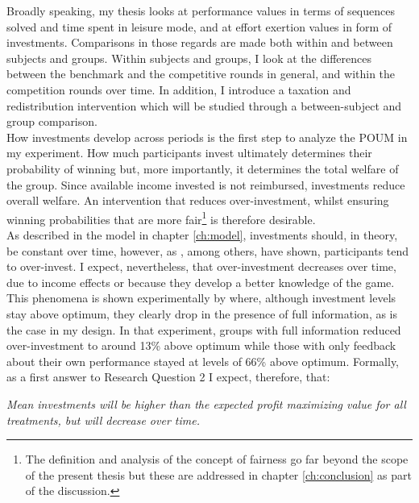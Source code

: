     Broadly speaking, my thesis looks at performance values in terms of sequences solved and time spent in leisure mode, and at effort exertion values in form of investments. Comparisons in those regards are made both within and between subjects and groups. Within subjects and groups, I look at the differences between the benchmark and the competitive rounds in general, and within the competition rounds over time. In addition, I introduce a taxation and redistribution intervention which will be studied through a between-subject and group comparison.\\
    
    How investments develop across periods is the first step to analyze the POUM in my experiment. How much participants invest ultimately determines their probability of winning but, more importantly, it determines the total welfare of the group. Since available income invested is not reimbursed, investments reduce overall welfare. An intervention that reduces over-investment, whilst ensuring winning probabilities that are more fair\footnote{The definition and analysis of the concept of fairness go far beyond the scope of the present thesis but these are addressed in chapter \ref{ch:conclusion} as part of the discussion.} is therefore desirable.\\
    
    As described in the model in chapter \ref{ch:model}, investments should, in theory, be constant over time, however, as \cite{sheremeta2016}, among others, have shown, participants tend to over-invest. I expect, nevertheless, that over-investment decreases over time, due to income effects or because they develop a better knowledge of the game. This phenomena is shown experimentally by \cite{fallucchi2013} where, although investment levels stay above optimum, they clearly drop in the presence of full information, as is the case in my design. In that experiment, groups with full information reduced over-investment to around 13\% above optimum while those with only feedback about their own performance stayed at levels of 66\% above optimum. Formally, as a first answer to Research Question 2 I expect, therefore, that:
    
    \begin{tcolorbox}[colback=UniVieGrau!15!white, colframe=white] 
    \begin{hyp} \label{hyp:treat}\textit{Mean investments will be higher than the expected profit maximizing value for all treatments, but will decrease over time.}\end{hyp}
    \end{tcolorbox}
    
